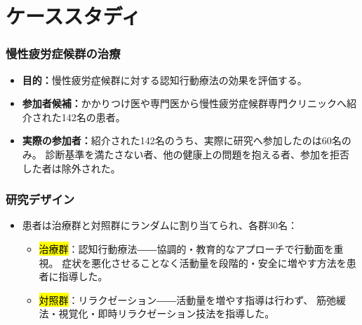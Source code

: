 
\section{ケーススタディ}


\begin{frame}
\frametitle{慢性疲労症候群の治療}

\begin{itemize}

\item \textbf{目的：}慢性疲労症候群に対する認知行動療法の効果を評価する。

\item \textbf{参加者候補：}かかりつけ医や専門医から慢性疲労症候群専門クリニックへ紹介された142名の患者。

\item \textbf{実際の参加者：}紹介された142名のうち、実際に研究へ参加したのは60名のみ。
診断基準を満たさない者、他の健康上の問題を抱える者、参加を拒否した者は除外された。

\end{itemize}


\end{frame}


\begin{frame}
\frametitle{研究デザイン}

\begin{itemize}

\item 患者は治療群と対照群にランダムに割り当てられ、各群30名：
\begin{itemize}
\item \hl{治療群}：認知行動療法――協調的・教育的なアプローチで行動面を重視。
症状を悪化させることなく活動量を段階的・安全に増やす方法を患者に指導した。
\item \hl{対照群}：リラクゼーション――活動量を増やす指導は行わず、
筋弛緩法・視覚化・即時リラクゼーション技法を指導した。
\end{itemize}

\end{itemize}

\end{frame}

